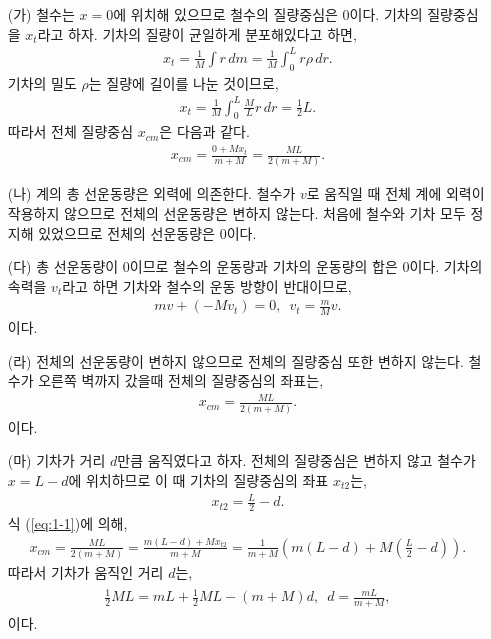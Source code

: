 \documentclass[floatfix,nofootinbib,superscriptaddress,fleqn]{revtex4-2}
\begin{document}
\begin{itemize}
\item[(가)] 철수는 $x=0$에 위치해 있으므로 철수의 질량중심은 0이다.
기차의 질량중심을 $x_t$라고 하자. 기차의 질량이 균일하게 분포해있다고 하면,
\begin{align}
  x_t = \frac{1}{M}\int r\,dm = \frac{1}{M}\int_0^L r\rho\,dr .
\end{align}
기차의 밀도 $\rho$는 질량에 길이를 나눈 것이므로,
\begin{align}
  x_t = \frac{1}{M}\int_0^L\frac{M}{L}r\,dr = \frac{1}{2}L.
\end{align} 
따라서 전체 질량중심 $x_{cm}$은 다음과 같다.
\begin{align}\label{eq:1-1}
  x_{cm} = \frac{0+Mx_t}{m+M} = \frac{ML}{2(m+M)}.
\end{align}
\item[(나)] 계의 총 선운동량은 외력에 의존한다. 철수가 $v$로 움직일 때 전체 계에
외력이 작용하지 않으므로 전체의 선운동량은 변하지 않는다. 처음에 철수와 기차 모두 정지해
있었으므로 전체의 선운동량은 0이다. 
\item[(다)] 총 선운동량이 0이므로 철수의 운동량과 기차의 운동량의 합은 0이다. 기차의 속력을 
$v_t$라고 하면 기차와 철수의 운동 방향이 반대이므로,
\begin{align}
  mv + (-Mv_t) = 0,\,\,\, v_t = \frac{m}{M}v.
\end{align}
이다.
\item[(라)] 전체의 선운동량이 변하지 않으므로 전체의 질량중심 또한 변하지 않는다. 철수가 
오른쪽 벽까지 갔을때 전체의 질량중심의 좌표는,
\begin{align}
  x_{cm} = \frac{ML}{2(m+M)}.
\end{align}
이다.
\item[(마)] 기차가 거리 $d$만큼 움직였다고 하자. 
전체의 질량중심은 변하지 않고 철수가 $x=L-d$에 위치하므로 
이 때 기차의 질량중심의 좌표 $x_{t2}$는,
\begin{align}
  x_{t2} = \frac{L}{2}-d. 
\end{align}
식 (\ref{eq:1-1})에 의해,
\begin{align}
  x_{cm} = \frac{ML}{2(m+M)}=\frac{m(L-d)+Mx_{t2}}{m+M}
  =\frac{1}{m+M}\left(m(L-d)+M\left(\frac{L}{2}-d\right)\right) .
\end{align}
따라서 기차가 움직인 거리 $ d$는,
\begin{align}
  \begin{split}
    \frac{1}{2}ML = mL+\frac{1}{2}ML -(m+M)d,\,\,\,
    d=\frac{mL}{m+M},
  \end{split}
\end{align}
이다.
\end{itemize}
\end{document}
